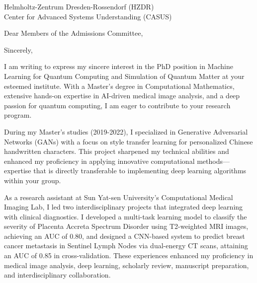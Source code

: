 \documentclass[11pt,a4paper,roman]{moderncv}
\date{\today}
\begin{document}
\vspace{-4em}
{
Helmholtz-Zentrum Dresden-Rossendorf (HZDR)\\
Center for Advanced Systems Understanding (CASUS)\\
}
\opening{Dear Members of the Admissions Committee,}
\closing{Sincerely,}
\makelettertitle
\thispagestyle{empty}
\pagestyle{empty}
I am writing to express my sincere interest in the PhD position in 
Machine Learning for Quantum Computing and Simulation of Quantum Matter at your esteemed institute. 
With a Master's degree in Computational Mathematics, 
extensive hands-on expertise in AI-driven medical image analysis, 
and a deep passion for quantum computing, I am eager to contribute to your research program.

During my Master's studies (2019-2022), 
I specialized in Generative Adversarial Networks (GANs) with a focus on style transfer learning 
for personalized Chinese handwritten characters. 
This project sharpened my technical abilities and enhanced my proficiency 
in applying innovative computational methods—expertise that is directly transferable 
to implementing deep learning algorithms within your group.

As a research assistant at Sun Yat-sen University's Computational Medical Imaging Lab, 
I led two interdisciplinary projects that integrated deep learning with clinical diagnostics. 
I developed a multi-task learning model to classify the severity of Placenta Accreta Spectrum Disorder using T2-weighted MRI images, achieving an AUC of 0.80, 
and designed a CNN-based system to predict breast cancer metastasis in Sentinel Lymph Nodes via dual-energy CT scans, attaining an AUC of 0.85 in cross-validation. 
These experiences enhanced my proficiency in medical image analysis, deep learning, scholarly review, manuscript preparation, and interdisciplinary collaboration.
\end{document}
